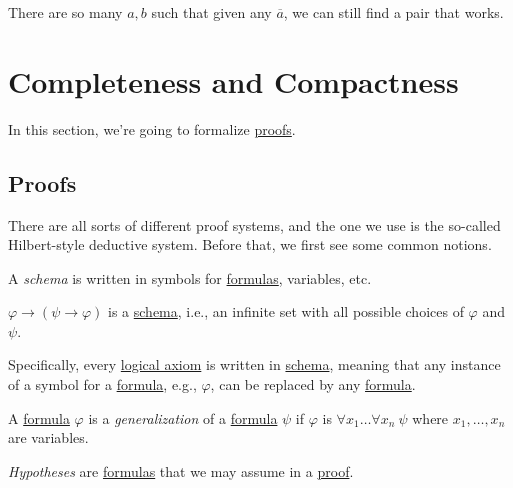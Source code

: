 \begin{intuition}
	There are so many \(a, b\) such that given any \(\overline{a} \), we can still find a pair that works.
\end{intuition}

\section{Completeness and Compactness}
In this section, we're going to formalize \hyperref[def:proof]{proofs}.

\subsection{Proofs}
There are all sorts of different proof systems, and the one we use is the so-called Hilbert-style deductive system. Before that, we first see some common notions.

\begin{notation}[Schema]\label{not:schema}
	A \emph{schema} is written in symbols for \hyperref[def:formula]{formulas}, variables, etc.
\end{notation}

\begin{eg}
	\(\varphi \to (\psi \to  \varphi )\) is a \hyperref[not:schema]{schema}, i.e., an infinite set with all possible choices of \(\varphi \) and \(\psi \).
\end{eg}

Specifically, every \hyperref[def:logical-axioms]{logical axiom} is written in \hyperref[not:schema]{schema}, meaning that any instance of a symbol for a \hyperref[def:formula]{formula}, e.g., \(\varphi \), can be replaced by any \hyperref[def:formula]{formula}.

\begin{definition}[Generalization]\label{def:generalization}
	A \hyperref[def:formula]{formula} \(\varphi \) is a \emph{generalization} of a \hyperref[def:formula]{formula} \(\psi \) if \(\varphi \) is \(\forall x_1 \ldots \forall x_n\ \psi \) where \(x_1, \ldots , x_n\) are variables.
\end{definition}

\begin{notation}[Hypothesis]\label{not:hypothesis}
	\emph{Hypotheses} are \hyperref[def:formula]{formulas} that we may assume in a \hyperref[def:proof]{proof}.
\end{notation}

